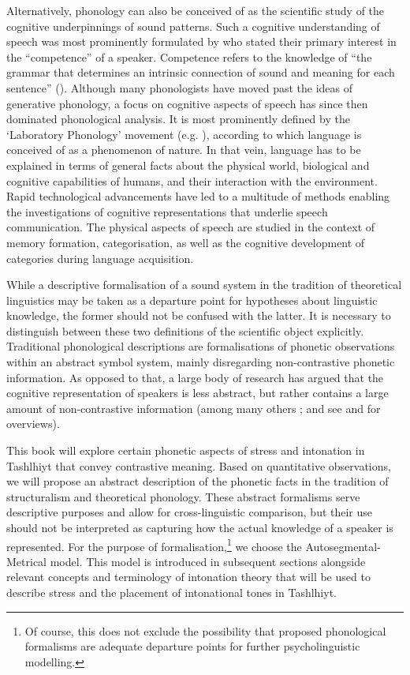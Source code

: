Alternatively, phonology can also be conceived of as the scientific study of the cognitive underpinnings of sound patterns. Such a cognitive understanding of speech was most prominently formulated by \citet{ChomskyHalle1968} who stated their primary interest in the “competence” of a speaker. Competence refers to the knowledge of “the grammar that determines an intrinsic connection of sound and meaning for each sentence” (\citealt[3]{ChomskyHalle1968}). Although many phonologists have moved past the ideas of generative phonology, a focus on cognitive aspects of speech has since then dominated phonological analysis. It is most prominently defined by the ‘Laboratory Phonology’ movement (e.g. \citealt{Pierr.etal2000}), according to which language is conceived of as a phenomenon of nature. In that vein, language has to be explained in terms of general facts about the physical world, biological and cognitive capabilities of humans, and their interaction with the environment. Rapid technological advancements have led to a multitude of methods enabling the investigations of cognitive representations that underlie speech communication. The physical aspects of speech are studied in the context of memory formation, categorisation, as well as the cognitive development of categories during language acquisition. 

While a descriptive formalisation of a sound system in the tradition of theoretical linguistics may be taken as a departure point for hypotheses about linguistic knowledge, the former should not be confused with the latter. It is necessary to distinguish between these two definitions of the scientific object explicitly. Traditional phonological descriptions are formalisations of phonetic observations within an abstract symbol system, mainly disregarding non-contrastive phonetic information. As opposed to that, a large body of research has argued that the cognitive representation of speakers is less abstract, but rather contains a large amount of non-contrastive information (among many others \citealt{Goldinger1998,Hawkins2003}; and see \citealt{Hawkins2012} and \citealt{Pierr2012} for overviews).

This book will explore certain phonetic aspects of stress and intonation in Tashlhiyt that convey contrastive meaning. Based on quantitative observations, we will propose an abstract description of the phonetic facts in the tradition of structuralism and theoretical phonology. These abstract formalisms serve descriptive purposes and allow for cross-linguistic comparison, but their use should not be interpreted as capturing how the actual knowledge of a speaker is represented. For the purpose of formalisation,\footnote{Of course, this does not exclude the possibility that proposed phonological formalisms are adequate departure points for further psycholinguistic modelling.} we choose the Autosegmental-Metrical model. This model is introduced in subsequent sections alongside relevant concepts and terminology of intonation theory that will be used to describe stress and the placement of intonational tones in Tashlhiyt.

